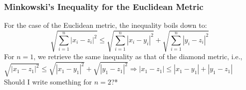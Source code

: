 \begin{frame}
\frametitle{Minkowski's Inequality for the Euclidean Metric}
For the case of the Euclidean metric, the inequality boils down to:
\begin{equation*}
    \sqrt{\sum_{i=1}^{n} |x_i - z_i|^2} \leq  \sqrt{\sum_{i=1}^{n} |x_i - y_i|^2} +  \sqrt{\sum_{i=1}^{n} |y_i - z_i|^2}
\end{equation*}
For $n=1$, we retrieve the same inequality as that of the diamond metric, i.e.,
$\sqrt{|x_1 - z_1|^2} \leq  \sqrt{|x_1 - y_1|^2} +  \sqrt{|y_1 - z_1|^2}
\Rightarrow|x_1 - z_1|\leq |x_1 - y_1|+|y_1 - z_1|$ \hfill\break
Should I write something for $n=2$?*
\end{frame}